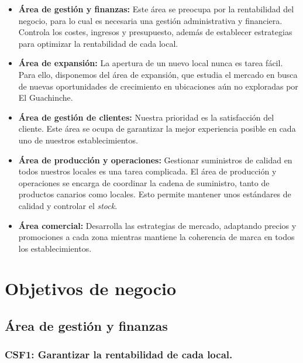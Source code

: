 \documentclass[12pt]{opticajnl}
\begin{document}
\begin{itemize}
    \item \textbf{Área de gestión y finanzas:} Este área se preocupa por la rentabilidad del negocio, para lo cual es necesaria una gestión administrativa y financiera. Controla los costes, ingresos y presupuesto, además de establecer estrategias para optimizar la rentabilidad de cada local.
    \item \textbf{Área de expansión:} La apertura de un nuevo local nunca es tarea fácil. Para ello, disponemos del área de expansión, que estudia el mercado en busca de nuevas oportunidades de crecimiento en ubicaciones aún no exploradas por El Guachinche.
    \item \textbf{Área de gestión de clientes:} Nuestra prioridad es la satisfacción del cliente. Este área se ocupa de garantizar la mejor experiencia posible en cada uno de nuestros establecimientos.
    \item \textbf{Área de producción y operaciones:} Gestionar suministros de calidad en todos nuestros locales es una tarea complicada. El área de producción y operaciones se encarga de coordinar la cadena de suministro, tanto de productos canarios como locales. Esto permite mantener unos estándares de calidad y controlar el \textit{stock}.
    \item \textbf{Área comercial:} Desarrolla las estrategias de mercado, adaptando precios y promociones a cada zona mientras mantiene la coherencia de marca en todos los establecimientos.
\end{itemize}













\section{Objetivos de negocio}

\subsection{Área de gestión y finanzas}

\subsubsection*{CSF1: Garantizar la rentabilidad de cada local.}
\end{document}
